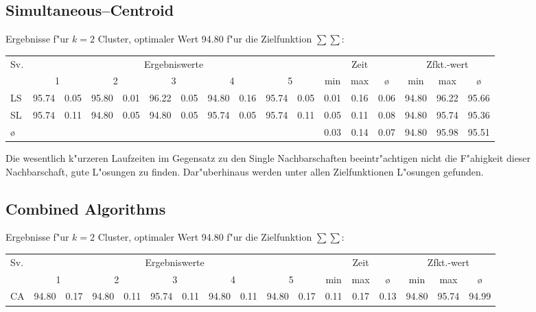 \subsection*{Simultaneous--Centroid}

Ergebnisse f"ur $k=2$ Cluster, optimaler Wert 94.80 f"ur die Zielfunktion 
$\sum\sum$:

{\footnotesize
\setlength\tabcolsep{0.75mm}
\begin{tabular}{l||rr|rr|rr|rr|rr||ccc||ccc}
Sv. & 
	\multicolumn{10}{c||}{{\normalsize Ergebniswerte} \rule[-1mm]{0mm}{5mm} } &
	\multicolumn{3}{c||}{{\normalsize Zeit}} & 
	\multicolumn{3}{c}{{\normalsize Zfkt.-wert}} \\ 
 & 
	\multicolumn{2}{c|}{1} &
	\multicolumn{2}{c|}{2} &
	\multicolumn{2}{c|}{3} &
	\multicolumn{2}{c|}{4} &
	\multicolumn{2}{c||}{5} &
	min & max & {\o} & min & max & {\o}\\
\hline
\hline
LS&95.74&0.05&95.80&0.01&96.22&0.05&94.80&0.16&95.74&0.05&0.01&0.16&0.06&94.80&96.22&95.66\\
SL&95.74&0.11&94.80&0.05&94.80&0.05&95.74&0.05&95.74&0.11&0.05&0.11&0.08&94.80&95.74&95.36\\
\hline
\multicolumn{1}{l}{{\o}} & \multicolumn{10}{c}{\quad} & 0.03&0.14&\multicolumn{1}{c}{0.07} & 94.80&95.98&95.51
\end{tabular}
}

Die wesentlich k"urzeren Laufzeiten im Gegensatz zu den Single Nachbarschaften
beeintr"achtigen nicht die F"ahigkeit dieser Nachbarschaft, gute 
L"osungen zu finden. Dar"uberhinaus werden unter allen Zielfunktionen
L"osungen gefunden.


\subsection*{Combined Algorithms}

Ergebnisse f"ur $k=2$ Cluster, optimaler Wert 94.80 f"ur die Zielfunktion 
$\sum\sum$:

{\footnotesize
\setlength\tabcolsep{0.75mm}
\begin{tabular}{l||rr|rr|rr|rr|rr||ccc||ccc}
Sv. & 
	\multicolumn{10}{c||}{{\normalsize Ergebniswerte} \rule[-1mm]{0mm}{5mm} } &
	\multicolumn{3}{c||}{{\normalsize Zeit}} & 
	\multicolumn{3}{c}{{\normalsize Zfkt.-wert}} \\ 
 & 
	\multicolumn{2}{c|}{1} &
	\multicolumn{2}{c|}{2} &
	\multicolumn{2}{c|}{3} &
	\multicolumn{2}{c|}{4} &
	\multicolumn{2}{c||}{5} &
	min & max & {\o} & min & max & {\o}\\
\hline
\hline
CA&94.80&0.17&94.80&0.11&95.74&0.11&94.80&0.11&94.80&0.17&0.11&0.17&0.13&94.80&95.74&94.99
\end{tabular}
}

